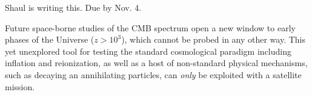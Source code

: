

\vspace{-0.13in}


Shaul is writing this. Due by Nov. 4.

%
Future space-borne studies of the CMB spectrum open a new window to early phases of the Universe ($z > 10^3$), 
which cannot be probed in any other way. This yet unexplored tool for testing the standard cosmological paradigm 
including inflation and reionization, 
as well as a host of non-standard physical mechanisms, such as decaying an annihilating particles, 
can {\it only} be exploited with a satellite mission. 
